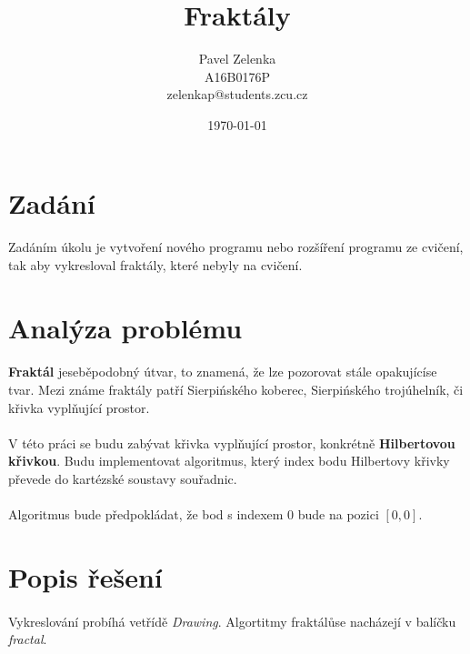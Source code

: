 \documentclass[12pt]{scrartcl}
\author{Pavel Zelenka\\A16B0176P\\zelenkap@students.zcu.cz}
\date{\today}
\title{Fraktály}
\begin{document}
\maketitle
{}
\newpage
{}
\newpage
\section{Zadání}
	
\paragraph{}
Zadáním úkolu je vytvoření nového programu nebo rozšíření programu ze cvičení, tak aby vykresloval fraktály, které nebyly na cvičení.

\section{Analýza problému}

\paragraph{}
\textbf{Fraktál} je\nobreakspace seběpodobný útvar, to znamená, že lze pozorovat stále opakující\nobreakspace se tvar. Mezi známe fraktály patří Sierpińského koberec, Sierpińského trojúhelník, či křivka vyplňující prostor.

\paragraph{}
V této práci se budu zabývat křivka vyplňující prostor, konkrétně \textbf{Hilbertovou křivkou}. Budu implementovat algoritmus, který index bodu Hilbertovy křivky převede do kartézské soustavy souřadnic.

\paragraph{}
Algoritmus bude předpokládat, že bod s indexem $0$ bude na pozici $[0,0]$. 

\section{Popis řešení}

\paragraph{}
Vykreslování probíhá ve\nobreakspace třídě \emph{Drawing}. Algortitmy fraktálů\nobreakspace  se nacházejí v balíčku \emph{fractal}.
\end{document}
